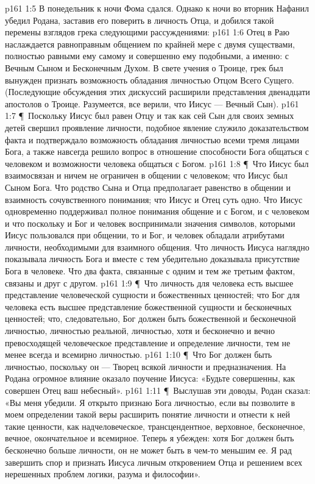 \vs p161 1:5 В понедельник к ночи Фома сдался. Однако к ночи во вторник Нафанил убедил Родана, заставив его поверить в личность Отца, и добился такой перемены взглядов грека следующими рассуждениями:
\vs p161 1:6 \bibnobreakspace Отец в Раю наслаждается равноправным общением по крайней мере с двумя существами, полностью равными ему самому и совершенно ему подобными, а именно: с Вечным Сыном и Бесконечным Духом. В свете учения о Троице, грек был вынужден признать возможность обладания личностью Отцом Всего Сущего. (Последующие обсуждения этих дискуссий расширили представления двенадцати апостолов о Троице. Разумеется, все верили, что Иисус --- Вечный Сын).
\vs p161 1:7 \P\ \bibnobreakspace Поскольку Иисус был равен Отцу и так как сей Сын для своих земных детей свершил проявление личности, подобное явление служило доказательством факта и подтверждало возможность обладания личностью всеми тремя лицами Бога, а также навсегда решило вопрос в отношение способности Бога общаться с человеком и возможности человека общаться с Богом.
\vs p161 1:8 \P\ \bibnobreakspace Что Иисус был взаимосвязан и ничем не ограничен в общении с человеком; что Иисус был Сыном Бога. Что родство Сына и Отца предполагает равенство в общении и взаимность сочувственного понимания; что Иисус и Отец суть одно. Что Иисус одновременно поддерживал полное понимания общение и с Богом, и с человеком и что поскольку и Бог и человек воспринимали значения символов, которыми Иисус пользовался при общении, то и Бог, и человек обладали атрибутами личности, необходимыми для взаимного общения. Что личность Иисуса наглядно показывала личность Бога и вместе с тем убедительно доказывала присутствие Бога в человеке. Что два факта, связанные с одним и тем же третьим фактом, связаны и друг с другом.
\vs p161 1:9 \P\ \bibnobreakspace Что личность для человека есть высшее представление человеческой сущности и божественных ценностей; что Бог для человека есть высшее представление божественной сущности и бесконечных ценностей; что, следовательно, Бог должен быть божественной и бесконечной личностью, личностью реальной, личностью, хотя и бесконечно и вечно превосходящей человеческое представление и определение личности, тем не менее всегда и всемирно личностью.
\vs p161 1:10 \P\ \bibnobreakspace Что Бог должен быть личностью, поскольку он --- Творец всякой личности и предназначения. На Родана огромное влияние оказало поучение Иисуса: «Будьте совершенны, как совершен Отец ваш небесный».
\vs p161 1:11 \P\ Выслушав эти доводы, Родан сказал: «Вы меня убедили. Я открыто признаю Бога личностью, если вы позволите в моем определении такой веры расширить понятие личности и отнести к ней такие ценности, как надчеловеческое, трансцендентное, верховное, бесконечное, вечное, окончательное и всемирное. Теперь я убежден: хотя Бог должен быть бесконечно больше личности, он не может быть в чем\hyp{}то меньшим ее. Я рад завершить спор и признать Иисуса личным откровением Отца и решением всех нерешенных проблем логики, разума и философии».

